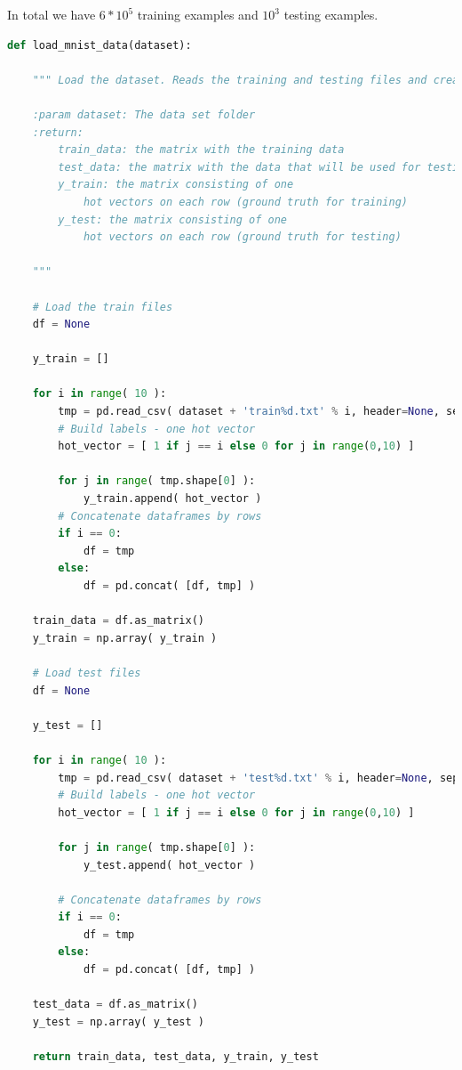\documentclass[11pt]{article}
\begin{document}
\noindent In total we have $6*10^5$ training examples and $10^3$ testing examples.
\begin{lstlisting}[language = Python]
def load_mnist_data(dataset):
    
    """ Load the dataset. Reads the training and testing files and creates matrices.
    
    :param dataset: The data set folder 
    :return:
        train_data: the matrix with the training data
        test_data: the matrix with the data that will be used for testing
        y_train: the matrix consisting of one 
            hot vectors on each row (ground truth for training)
        y_test: the matrix consisting of one
            hot vectors on each row (ground truth for testing)    
            
    """
    
    # Load the train files
    df = None
    
    y_train = []

    for i in range( 10 ):
        tmp = pd.read_csv( dataset + 'train%d.txt' % i, header=None, sep=" " )
        # Build labels - one hot vector
        hot_vector = [ 1 if j == i else 0 for j in range(0,10) ]
        
        for j in range( tmp.shape[0] ):
            y_train.append( hot_vector )
        # Concatenate dataframes by rows    
        if i == 0:
            df = tmp
        else:
            df = pd.concat( [df, tmp] )

    train_data = df.as_matrix()
    y_train = np.array( y_train )
    
    # Load test files
    df = None
    
    y_test = []

    for i in range( 10 ):
        tmp = pd.read_csv( dataset + 'test%d.txt' % i, header=None, sep=" " )
        # Build labels - one hot vector
        hot_vector = [ 1 if j == i else 0 for j in range(0,10) ]
        
        for j in range( tmp.shape[0] ):
            y_test.append( hot_vector )
            
        # Concatenate dataframes by rows    
        if i == 0:
            df = tmp
        else:
            df = pd.concat( [df, tmp] )

    test_data = df.as_matrix()
    y_test = np.array( y_test )
    
    return train_data, test_data, y_train, y_test
\end{lstlisting}
\end{document}
